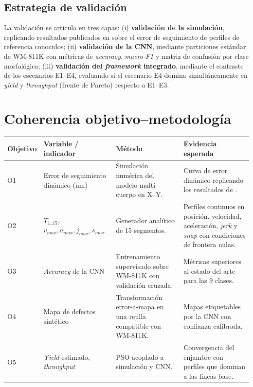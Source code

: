 \documentclass[11pt]{article}
\begin{document}
\subsection*{Estrategia de validación}

La validación se articula en tres capas: (i) \textbf{validación de la simulación}, replicando resultados publicados en \cite{Al-Rawashdeh2022_Caracterization,Al-Rawashdeh2023a} sobre el error de seguimiento de perfiles de referencia conocidos; (ii) \textbf{validación de la CNN}, mediante particiones estándar de WM-811K con métricas de \textit{accuracy}, \textit{macro-F1} y matriz de confusión por clase morfológica; (iii) \textbf{validación del \textit{framework} integrado}, mediante el contraste de los escenarios E1--E4, evaluando si el escenario E4 domina simultáneamente en \textit{yield} y \textit{throughput} (frente de Pareto) respecto a E1--E3.

\section{Coherencia objetivo--metodología}

\begin{table}[H]
\centering
\small
\setlength{\tabcolsep}{4pt}
\renewcommand{\arraystretch}{1.35}
\begin{tabular}{L{2.2cm} L{3.5cm} L{4cm} L{4.5cm}}
\toprule
\textbf{Objetivo} & \textbf{Variable / indicador} & \textbf{Método} & \textbf{Evidencia esperada} \\
\midrule
O1 & Error de seguimiento dinámico (nm) & Simulación numérica del modelo multi-cuerpo en X--Y. & Curva de error dinámico replicando los resultados de \cite{Al-Rawashdeh2022_Caracterization}. \\
O2 & $T_{1..15}$, $v_{max},a_{max},j_{max},s_{max}$ & Generador analítico de 15 segmentos. & Perfiles continuos en posición, velocidad, aceleración, \textit{jerk} y \textit{snap} con condiciones de frontera nulas. \\
O3 & \textit{Accuracy} de la CNN & Entrenamiento supervisado sobre WM-811K con validación cruzada. & Métricas superiores al estado del arte para las 9 clases. \\
O4 & Mapa de defectos sintético & Transformación error-a-mapa en una rejilla compatible con WM-811K. & Mapas etiquetables por la CNN con confianza calibrada. \\
O5 & \textit{Yield} estimado, \textit{throughput} & PSO acoplado a simulación y CNN. & Convergencia del enjambre con perfiles que dominan a las líneas base. \\
\bottomrule
\end{tabular}
\end{table}
\end{document}
